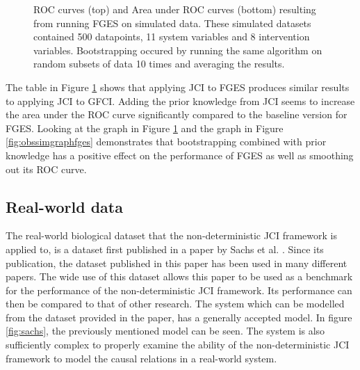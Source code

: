 \documentclass[a4paper,pdf]{article}
\begin{document}
\begin{figure}[!ht]
    \centering   
    \renewcommand{\arraystretch}{2}
    \setlength{\tabcolsep}{7pt}
    \caption{ROC curves (top) and Area under ROC curves (bottom) resulting from running FGES on simulated data. These simulated datasets contained 500 datapoints, 11 system variables and 8 intervention variables. Bootstrapping occured by running the same algorithm on random subsets of data 10 times and averaging the results.\label{fig:simgraphfges}}
\end{figure}

The table in Figure \ref{fig:simgraphfges} shows that applying JCI to FGES produces similar results to applying JCI to GFCI. Adding the prior knowledge from JCI seems to increase the area under the ROC curve significantly compared to the baseline version for FGES. Looking at the graph in Figure \ref{fig:simgraphfges} and the graph in Figure \ref{fig:obssimgraphfges} demonstrates that bootstrapping combined with prior knowledge has a positive effect on the performance of FGES as well as smoothing out its ROC curve. 


\subsection{Real-world data}

The real-world biological dataset that the non-deterministic JCI framework is applied to, is a dataset first published in a paper by Sachs et al. \cite{sachs2005causal}. Since its publication, the dataset published in this paper has been used in many different papers. The wide use of this dataset allows this paper to be used as a benchmark for the performance of the non-deterministic JCI framework. Its performance can then be compared to that of other research. The system which can be modelled from the dataset provided in the paper, has a generally accepted model. In figure \ref{fig:sachs}, the previously mentioned model can be seen. The system is also sufficiently complex to properly examine the ability of the non-deterministic JCI framework to model the causal relations in a real-world system.
\end{document}
